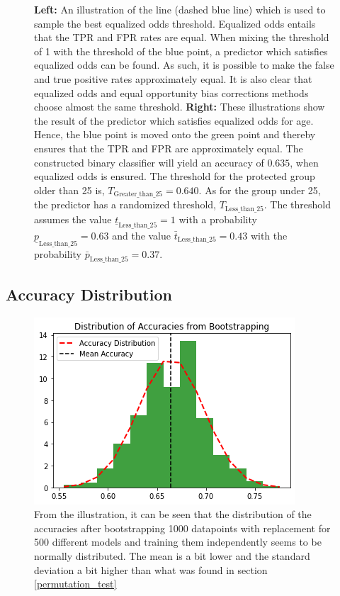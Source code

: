 \documentclass[11pt, fleqn, titlepage]{article}
\begin{document}
\begin{figure}[H]
		\caption{\textbf{Left:} An illustration of the line (dashed blue line) which is used to sample the best equalized odds threshold. Equalized odds entails that the TPR and FPR rates are equal. When mixing the threshold of 1 with the threshold of the blue point, a predictor which satisfies equalized odds can be found. As such, it is possible to make the false and true positive rates approximately equal. It is also clear that equalized odds and equal opportunity bias corrections methods choose almost the same threshold.  \textbf{Right:} These illustrations show the result of the predictor which satisfies equalized odds for age. Hence, the blue point is moved onto the green point and thereby ensures that the TPR and FPR are approximately equal. The constructed binary classifier will yield an accuracy of $ 0.635 $, when equalized odds is ensured. The threshold for the protected group older than 25 is, $ T_{\text{Greater\_than\_25}} = 0.640 $. As for the group under 25, the predictor has a randomized threshold, $ T_{\text{Less\_than\_25}} $. The threshold assumes the value $\underline t_{\text{Less\_than\_25}} = 1 $  with a probability $ \underline p_{\text{Less\_than\_25}}= 0.63 $ and the value $ \bar t_{\text{Less\_than\_25}} = 0.43 $ with the probability $\bar p_{\text{Less\_than\_25}} = 0.37 $.}
		\label{fig:equalizedOddsage}
	\end{figure}
	
	\subsection{Accuracy Distribution}
	\begin{figure}[H]
		\centering
		\includegraphics[width=0.5\linewidth]{imgs/accuracy_distribution}
		\caption{From the illustration, it can be seen that the distribution of the accuracies after bootstrapping 1000 datapoints with replacement for 500 different models and training them independently seems to be normally distributed. The mean is a bit lower and the standard deviation a bit higher than what was found in section \ref{permutation_test}}
		\label{fig:accuracydistribution}
	\end{figure}
	
\end{document}
